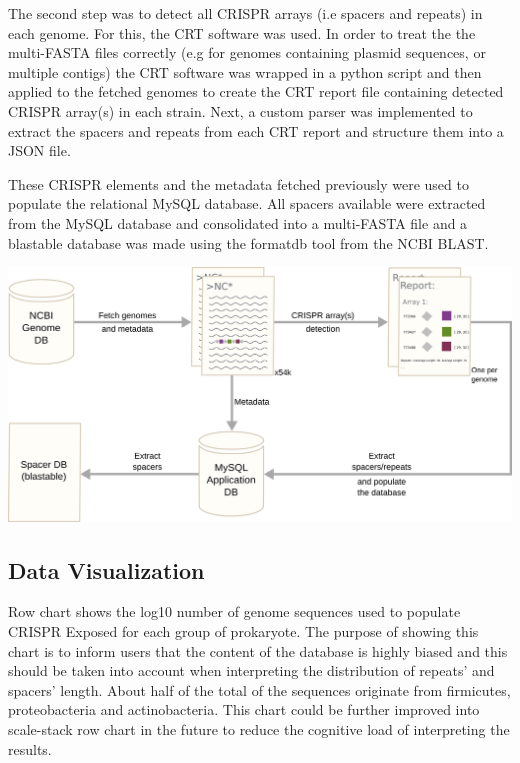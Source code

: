 \documentclass[11pt, a4paper,titlepage]{article}
\begin{document}
The second step was to detect all CRISPR arrays (i.e spacers and
repeats) in each genome. For this, the CRT software
\cite{bland2007crispr} was used. In order to treat the the multi-FASTA
files correctly (e.g for genomes containing plasmid sequences, or
multiple contigs) the CRT software was wrapped in a python script and
then applied to the fetched genomes to create the CRT report file
containing detected CRISPR array(s) in each strain. Next, a custom
parser was implemented to extract the spacers and repeats from each
CRT report and structure them into a JSON file.

These CRISPR elements and the metadata fetched previously were used to
populate the relational MySQL database. All spacers available were
extracted from the MySQL database and consolidated into a multi-FASTA
file and a blastable database was made using the formatdb tool from
the NCBI BLAST.

\begin{center}
\includegraphics[scale=0.5]{figures/pipeline.png}
\end{center}

\subsection{Data Visualization}

Row chart shows the log10 number of genome sequences used to populate
CRISPR Exposed for each group of prokaryote. The purpose of showing
this chart is to inform users that the content of the database is
highly biased and this should be taken into account when interpreting
the distribution of repeats’ and spacers’ length. About half of the
total of the sequences originate from firmicutes, proteobacteria and
actinobacteria. This chart could be further improved into scale-stack
row chart in the future to reduce the cognitive load of interpreting
the results.
\end{document}

